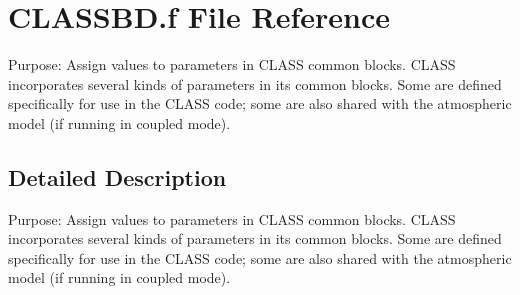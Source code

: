 \hypertarget{CLASSBD_8f}{}\section{C\+L\+A\+S\+S\+B\+D.\+f File Reference}
\label{CLASSBD_8f}


Purpose\+: Assign values to parameters in C\+L\+A\+S\+S common blocks. C\+L\+A\+S\+S incorporates several kinds of parameters in its common blocks. Some are defined specifically for use in the C\+L\+A\+S\+S code; some are also shared with the atmospheric model (if running in coupled mode).  




\subsection{Detailed Description}
Purpose\+: Assign values to parameters in C\+L\+A\+S\+S common blocks. C\+L\+A\+S\+S incorporates several kinds of parameters in its common blocks. Some are defined specifically for use in the C\+L\+A\+S\+S code; some are also shared with the atmospheric model (if running in coupled mode). 

